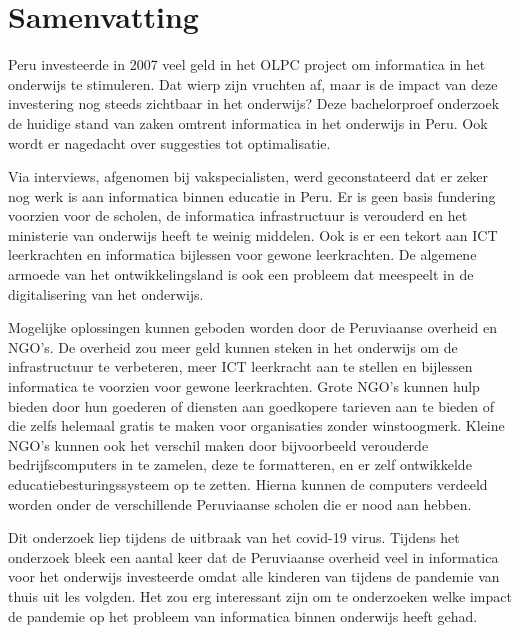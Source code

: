 %
%

%

\chapter*{Samenvatting}
\label{ch:samenvatting}
Peru investeerde in 2007 veel geld in het OLPC project om informatica in het onderwijs te stimuleren. Dat wierp zijn vruchten af, maar is de impact van deze investering nog steeds zichtbaar in het onderwijs? Deze bachelorproef onderzoek de huidige stand van zaken omtrent informatica in het onderwijs in Peru. Ook wordt er nagedacht over suggesties tot optimalisatie. 

Via interviews, afgenomen bij vakspecialisten, werd geconstateerd dat er zeker nog werk is aan informatica binnen educatie in Peru. Er is geen basis fundering voorzien voor de scholen, de informatica infrastructuur is verouderd en het ministerie van onderwijs heeft te weinig middelen. Ook is er een tekort aan ICT leerkrachten en informatica bijlessen voor gewone leerkrachten. De algemene armoede van het ontwikkelingsland is ook een probleem dat meespeelt in de digitalisering van het onderwijs. 

Mogelijke oplossingen kunnen geboden worden door de Peruviaanse overheid en NGO's. De overheid zou meer geld kunnen steken in het onderwijs om de infrastructuur te verbeteren, meer ICT leerkracht aan te stellen en bijlessen informatica te voorzien voor gewone leerkrachten. Grote NGO's kunnen hulp bieden door hun goederen of diensten aan goedkopere tarieven aan te bieden of die zelfs helemaal gratis te maken voor organisaties zonder winstoogmerk. Kleine NGO's kunnen ook het verschil maken door bijvoorbeeld verouderde bedrijfscomputers in te zamelen, deze te formatteren, en er zelf ontwikkelde educatiebesturingssysteem op te zetten. Hierna kunnen de computers verdeeld worden onder de verschillende Peruviaanse scholen die er nood aan hebben. 

Dit onderzoek liep tijdens de uitbraak van het covid-19 virus. Tijdens het onderzoek bleek een aantal keer dat de Peruviaanse overheid veel in informatica voor het onderwijs investeerde omdat alle kinderen van tijdens de pandemie van thuis uit les volgden. Het zou erg interessant zijn om te onderzoeken welke impact de pandemie op het probleem van informatica binnen onderwijs heeft gehad.


